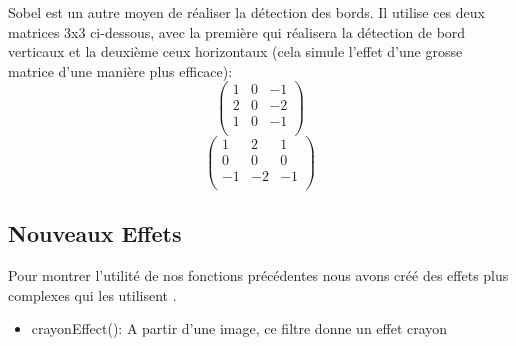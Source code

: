 \documentclass[12pt]{article}
\begin{document}
\begin{itemize}
\begin{itemize}
        Sobel est un autre moyen de réaliser la détection des bords.
        Il utilise ces deux matrices 3x3 ci-dessous, avec la première qui réalisera la détection de bord verticaux et la deuxième ceux horizontaux
        (cela simule l'effet d'une grosse matrice d'une manière plus efficace):
        \begin{equation}
            \begin{pmatrix}
                1 &  0 & -1 \\
                2 & 0 & -2 \\
                1 & 0 & -1 \\
            \end{pmatrix}
        \end{equation} 
        \begin{equation}
            \begin{pmatrix}
                1 &  2 & 1 \\
                0 & 0 & 0 \\
                -1 & -2 & -1 \\
            \end{pmatrix}
        \end{equation} 
        
    
    \end{itemize}

\subsection{Nouveaux Effets}

Pour montrer l'utilité de nos fonctions précédentes nous avons créé des effets plus complexes qui les utilisent .
\begin{itemize}
    \item crayonEffect():
    A partir d'une image, ce filtre donne un effet crayon


\end{itemize}
\end{itemize}
\end{document}
